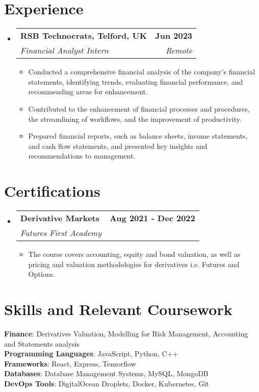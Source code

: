\documentclass[letterpaper,11pt]{article}
\makeatletter
\newcommand{\resumeItem}[1]{
  \item\small{
    {#1 \vspace{-2pt}}
  }
}
\newcommand{\resumeSubheading}[4]{
  \vspace{-2pt}\item
    \begin{tabular*}{1.0\textwidth}[t]{l@{\extracolsep{\fill}}r}
      \textbf{#1} & \textbf{\small #2} \\
      \textit{\small#3} & \textit{\small #4} \\
    \end{tabular*}\vspace{-7pt}
}
\newcommand{\resumeSubHeadingListStart}{\begin{itemize}[leftmargin=0.0in, label={}]}
\newcommand{\resumeSubHeadingListEnd}{\end{itemize}}
\newcommand{\resumeItemListStart}{\begin{itemize}}
\newcommand{\resumeItemListEnd}{\end{itemize}\vspace{-5pt}}
\makeatother
\begin{document}
 \section{Experience}
\resumeSubHeadingListStart
\resumeSubheading
{RSB Technocrats, Telford, UK }{Jun 2023 }
{Financial Analyst Intern}{ Remote}
\resumeItemListStart
\resumeItem{Conducted a comprehensive financial analysis of the company's financial statements, identifying trends, evaluating financial performance, and recommending areas for enhancement.}
\resumeItem{Contributed to the enhancement of financial processes and procedures, the streamlining of workflows, and the improvement of productivity.}
 \resumeItem{Prepared financial reports, such as balance sheets, income statements, and cash flow statements, and presented key insights and recommendations to management.}
\resumeItemListEnd
\resumeSubHeadingListEnd
\vspace{-12pt}
 \section{Certifications}
\resumeSubHeadingListStart
\resumeSubheading
{Derivative Markets}{Aug 2021 - Dec 2022}
{Futures First Academy}{}
\resumeItemListStart
\resumeItem{The course covers accounting, equity and bond valuation, as well as pricing and valuation methodologies for derivatives i.e. Futures and Options.}
\resumeItemListEnd
\resumeSubHeadingListEnd
\vspace{-14pt}
\section{Skills and Relevant Coursework}
 \begin{itemize}[leftmargin=0.15in, label={}]
    \small{\item{
    \textbf{Finance}{: Derivatives Valuation, Modelling for Risk Management, Accounting and Statements analysis}\\
     \textbf{Programming Languages}{: JavaScript, Python, C++}\\
    
     \textbf{Frameworks}{: React, Express, Tensorflow}\\
    \textbf{Databases}{: Database Management Systems, MySQL, MongoDB }\\ 
     \textbf{DevOps Tools}{: DigitalOcean Droplets, Docker, Kubernetes, Git}\\
         
}}
 \end{itemize}
 \vspace{-14pt}
\end{document}
